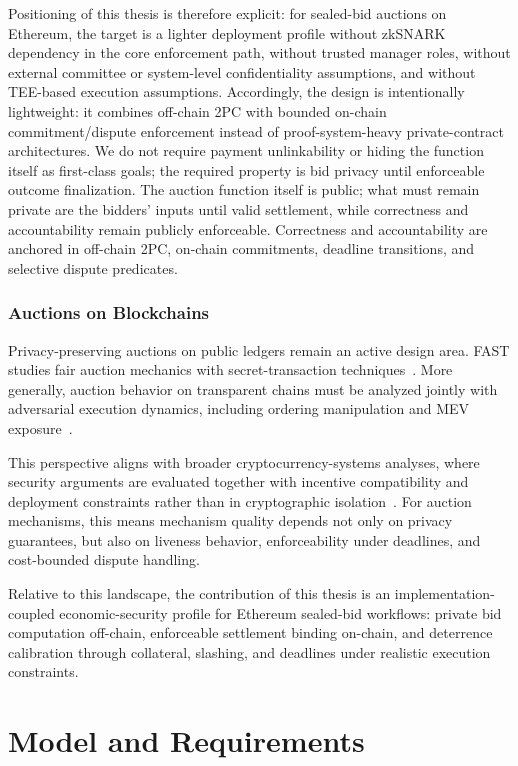 \documentclass[final,twoside]{vutinfth}
\begin{document}
Positioning of this thesis is therefore explicit: for sealed-bid auctions on Ethereum, the target is a lighter deployment profile without zkSNARK dependency in the core enforcement path, without trusted manager roles, without external committee or system-level confidentiality assumptions, and without TEE-based execution assumptions. Accordingly, the design is intentionally lightweight: it combines off-chain 2PC with bounded on-chain commitment/dispute enforcement instead of proof-system-heavy private-contract architectures. We do not require payment unlinkability or hiding the function itself as first-class goals; the required property is bid privacy until enforceable outcome finalization. The auction function itself is public; what must remain private are the bidders' inputs until valid settlement, while correctness and accountability remain publicly enforceable. Correctness and accountability are anchored in off-chain 2PC, on-chain commitments, deadline transitions, and selective dispute predicates.

\subsection{Auctions on Blockchains}
Privacy-preserving auctions on public ledgers remain an active design area. FAST studies fair auction mechanics with secret-transaction techniques~\cite{David2021FAST}. More generally, auction behavior on transparent chains must be analyzed jointly with adversarial execution dynamics, including ordering manipulation and MEV exposure~\cite{Daian2019FlashBoys,Qin2022MEV}.

This perspective aligns with broader cryptocurrency-systems analyses, where security arguments are evaluated together with incentive compatibility and deployment constraints rather than in cryptographic isolation~\cite{Bonneau2015SoK}. For auction mechanisms, this means mechanism quality depends not only on privacy guarantees, but also on liveness behavior, enforceability under deadlines, and cost-bounded dispute handling.

Relative to this landscape, the contribution of this thesis is an implementation-coupled economic-security profile for Ethereum sealed-bid workflows: private bid computation off-chain, enforceable settlement binding on-chain, and deterrence calibration through collateral, slashing, and deadlines under realistic execution constraints.

\chapter{Model and Requirements}
\end{document}
